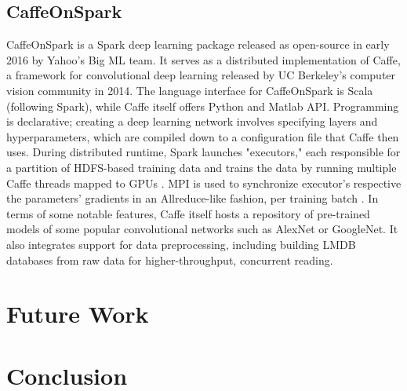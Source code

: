 \documentclass{article}
\begin{document}
\subsection{CaffeOnSpark}
CaffeOnSpark is a Spark deep learning package released as open-source in early 2016 by Yahoo's Big ML team. It serves as a distributed implementation of Caffe, a framework for convolutional deep learning released by UC Berkeley's computer vision community in 2014. The language interface for CaffeOnSpark is Scala (following Spark), while Caffe itself offers Python and Matlab API. Programming is declarative; creating a deep learning network involves specifying layers and hyperparameters, which are compiled down to a configuration file that Caffe then uses. During distributed runtime, Spark launches "executors," each responsible for a partition of HDFS-based training data and trains the data by running multiple Caffe threads mapped to GPUs \cite{Large52:online}. MPI is used to synchronize executor's respective the parameters' gradients in an Allreduce-like fashion, per training batch \cite{Caffe27:online}. In terms of some notable features, Caffe itself hosts a repository of pre-trained models of some popular convolutional networks such as AlexNet or GoogleNet. It also integrates support for data preprocessing, including building LMDB databases from raw data for higher-throughput, concurrent reading. 

\section{Future Work}
\section{Conclusion}

 

\end{document}
